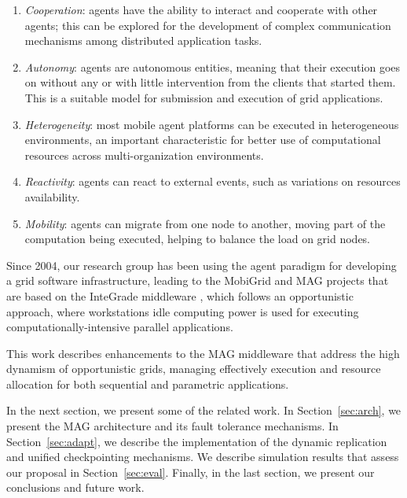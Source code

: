 \documentclass{cpeauth}
\begin{document}
\begin{enumerate}
    \item \emph{Cooperation}: agents have the ability to interact and cooperate
    with other agents; this can be explored for the development of complex
    communication mechanisms among distributed application tasks.
   
    \item \emph{Autonomy}: agents are autonomous entities, meaning that their
    execution goes on without any or with little intervention from the clients
    that started them. This is a suitable model for submission and execution
    of grid applications.
  
    \item \emph{Heterogeneity}: most mobile agent platforms can be executed
    in heterogeneous environments, an important characteristic for better use
    of computational resources across multi-organization environments.
  
    \item \emph{Reactivity}: agents can react to external events, such as
    variations on resources availability.
  
    \item \emph{Mobility}: agents can migrate from one node to another,
    moving part of the computation being executed, helping to balance the load on grid nodes.
\end{enumerate}

Since 2004, our research group has been using the agent paradigm
for developing a grid software infrastructure, leading to the MobiGrid \cite{barbosa04} and MAG \cite{lopes05}
projects  that are based on the
InteGrade middleware \cite{goldchleger04}, which follows an opportunistic approach, where
workstations idle computing power is used for executing
computationally-intensive parallel applications.

This work describes enhancements to the MAG middleware that
address the high dynamism of opportunistic
grids, managing effectively execution and resource allocation for both sequential and
parametric applications. 

In the next section, we present some of the related work. In
Section~\ref{sec:arch}, we present the MAG architecture and its fault tolerance
mechanisms. In Section~\ref{sec:adapt}, we describe the implementation
of the dynamic replication and unified checkpointing mechanisms. We describe
simulation results that assess our proposal in Section~\ref{sec:eval}.
Finally, in the last section, we present our conclusions and future work.
\end{document}
